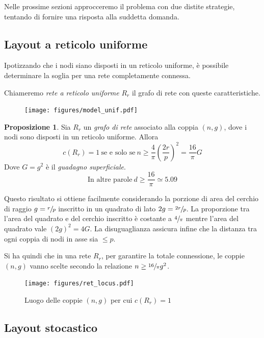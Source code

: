 \documentclass[a4paper,12pt]{article}
\theoremstyle{definition}
\newtheorem{proposition}{Proposizione}
\begin{document}
Nelle prossime sezioni approcceremo il problema con due distite strategie, tentando di fornire una risposta alla suddetta domanda.

\subsection{Layout a reticolo uniforme}

Ipotizzando che i nodi siano disposti in un reticolo uniforme, è possibile determinare la soglia per una rete completamente connessa.

Chiameremo \emph{rete a reticolo uniforme} $R_r$ il grafo di rete con queste caratteristiche.

\begin{figure}[H]
\centering
\texttt{[image: figures/model\_unif.pdf]}
\caption{}
\end{figure}

\begin{proposition}
Sia $R_r$ un \emph{grafo di rete} associato alla coppia $(n, g)$, dove i nodi sono disposti in un reticolo uniforme. Allora
\begin{equation*}
c(R_r) = 1 \ \text{se e solo se} \ n \geq \frac{4}{\pi} \left(\frac{2r}{p}\right)^2 = \frac{16}{\pi} G
\end{equation*}
Dove $G = g^2$ è il \emph{guadagno superficiale}.
\begin{equation*}
\text{In altre parole} \ d \geq \frac{16}{\pi} \simeq 5.09
\end{equation*}
\end{proposition}

Questo risultato si ottiene facilmente considerando la porzione di area del cerchio di raggio $g = \sfrac{r}{p}$ inscritto in un quadrato di lato $2g = \sfrac{2r}{p}$. La proporzione tra l'area del quadrato e del cerchio inscritto è costante a $\sfrac{4}{\pi}$ mentre l'area del quadrato vale $(2g)^2 = 4G$. La disuguaglianza assicura infine che la distanza tra ogni coppia di nodi in asse sia $\leq p$.

Si ha quindi che in una rete $R_r$, per garantire la totale connessione, le coppie $(n, g)$ vanno scelte secondo la relazione $n \geq \sfrac{16}{\pi} g^2$.

\begin{figure}[H]
\centering
\texttt{[image: figures/ret\_locus.pdf]}
\caption{Luogo delle coppie $(n, g)$ per cui $c(R_r) = 1$}
\end{figure}

\subsection{Layout stocastico}
\end{document}

